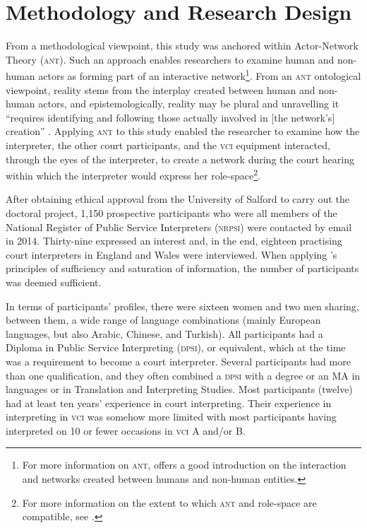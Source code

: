\documentclass[output=paper]{langsci/langscibook}
\begin{document}
\section{Methodology and Research Design}
\label{sec:devaux:4}
From a methodological viewpoint, this study was anchored within Actor-Network Theory (\textsc{ant}). Such an approach enables researchers to examine human and non-human actors as forming part of an interactive network\footnote{For more information on \textsc{ant}, \citet{Latour2005} offers a good introduction on the interaction and networks created between humans and non-human entities.}. From an \textsc{ant} ontological viewpoint, reality stems from the interplay created between human and non-human actors, and epistemologically, reality may be plural and unravelling it “requires identifying and following those actually involved in [the network’s] creation” \citep[112]{Bonner2013}. Applying \textsc{ant} to this study enabled the researcher to examine how the interpreter, the other court participants, and the \textsc{vci} equipment interacted, through the eyes of the interpreter, to create a network during the court hearing within which the interpreter would express her role-space\footnote{For more information on the extent to which \textsc{ant} and role-space are compatible, see \citet{Devaux2017b}.}. 

After obtaining ethical approval from the University of Salford to carry out the doctoral project, 1,150 prospective participants who were all members of the National Register of Public Service Interpreters (\textsc{nrpsi}) were contacted by email in 2014. Thirty-nine expressed an interest and, in the end, eighteen practising court interpreters in England and Wales were interviewed. When applying \citet{Seidman2006}’s principles of sufficiency and saturation of information, the number of participants was deemed sufficient. 

In terms of participants’ profiles, there were sixteen women and two men sharing, between them, a wide range of language combinations (mainly European languages, but also Arabic, Chinese, and Turkish). All participants had a Diploma in Public Service Interpreting (\textsc{dpsi}), or equivalent, which at the time was a requirement to become a court interpreter. Several participants had more than one qualification, and they often combined a \textsc{dpsi} with a degree or an MA in languages or in Translation and Interpreting Studies. Most participants (twelve) had at least ten years’ experience in court interpreting. Their experience in interpreting in \textsc{vci} was somehow more limited with most participants having interpreted on 10 or fewer occasions in \textsc{vci} A and/or B.   
\end{document}
